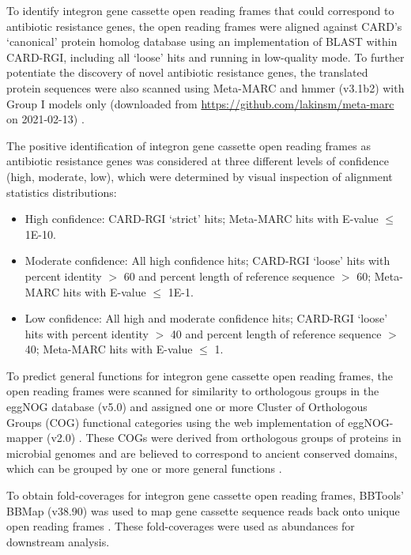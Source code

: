 To identify integron gene cassette open reading frames that could correspond to antibiotic resistance genes, the open reading frames were aligned against CARD’s ‘canonical’ protein homolog database using an implementation of BLAST within CARD-RGI, including all ‘loose’ hits and running in low-quality mode.
To further potentiate the discovery of novel antibiotic resistance genes, the translated protein sequences were also scanned using Meta-MARC and hmmer (v3.1b2) with Group I models only (downloaded from \url{https://github.com/lakinsm/meta-marc} on 2021-02-13) \parencite{Lakin.2019, Wheeler.2013}.

The positive identification of integron gene cassette open reading frames as antibiotic resistance genes was considered at three different levels of confidence (high, moderate, low), which were determined by visual inspection of alignment statistics distributions:

\begin{itemize}
	\item{High confidence: CARD-RGI ‘strict’ hits; Meta-MARC hits with E-value $\leq$ 1E-10.}
	\item{Moderate confidence: All high confidence hits; CARD-RGI ‘loose’ hits with percent identity $>$ 60 and percent length of reference sequence $>$ 60; Meta-MARC hits with E-value $\leq$ 1E-1.}
	\item{Low confidence: All high and moderate confidence hits; CARD-RGI ‘loose’ hits with percent identity $>$ 40 and percent length of reference sequence $>$ 40; Meta-MARC hits with E-value $\leq$ 1.}
\end{itemize}

To predict general functions for integron gene cassette open reading frames, the open reading frames were scanned for similarity to orthologous groups in the eggNOG database (v5.0) and assigned one or more Cluster of Orthologous Groups (COG) functional categories using the web implementation of eggNOG-mapper (v2.0) \parencite{HuertaCepas.2019}.
These COGs were derived from orthologous groups of proteins in microbial genomes and are believed to correspond to ancient conserved domains, which can be grouped by one or more general functions \parencite{Galperin.2019}.

To obtain fold-coverages for integron gene cassette open reading frames, BBTools’ BBMap (v38.90) was used to map gene cassette sequence reads back onto unique open reading frames \parencite{Bushnell.2016}.
These fold-coverages were used as abundances for downstream analysis.

